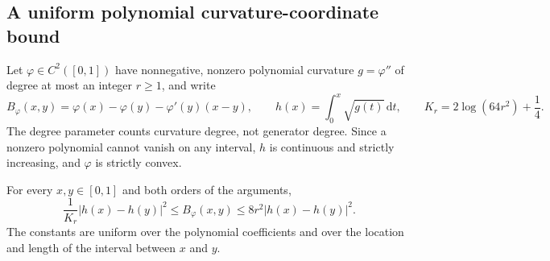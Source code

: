 
\subsection{A uniform polynomial curvature-coordinate bound}
\label{sec:poly-allcap-new}

Let $\varphi\in C^2([0,1])$ have nonnegative, nonzero polynomial curvature
$g=\varphi''$ of degree at most an integer $r\ge1$, and write
\[
 B_\varphi(x,y)=\varphi(x)-\varphi(y)-\varphi'(y)(x-y),
 \qquad h(x)=\int_0^x\sqrt{g(t)}\,\mathrm dt,
 \qquad K_r=2\log(64r^2)+\frac14.
\]
The degree parameter counts curvature degree, not generator degree.
Since a nonzero polynomial cannot vanish on any interval, $h$ is continuous
and strictly increasing, and $\varphi$ is strictly convex.

\begin{lemma}
\label{lem:poly-h-new}
For every $x,y\in[0,1]$ and both orders of the arguments,
\begin{equation}
 \frac{1}{K_r}|h(x)-h(y)|^2
 \le B_\varphi(x,y)
 \le 8r^2|h(x)-h(y)|^2.
 \label{eq:poly-h-new}
\end{equation}
The constants are uniform over the polynomial coefficients and over the
location and length of the interval between $x$ and $y$.
\end{lemma}

